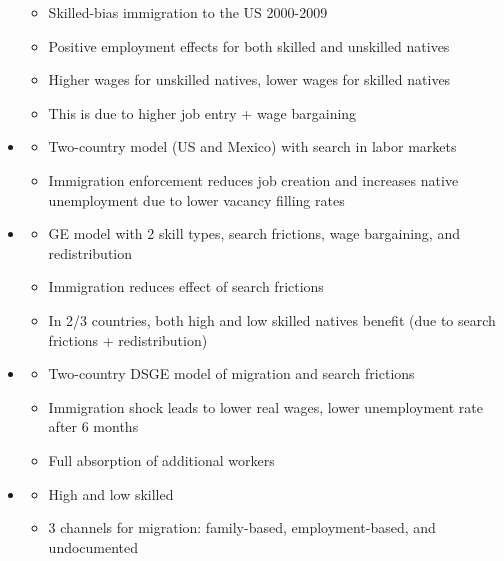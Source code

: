 \documentclass[12pt]{article}
\begin{document}
\begin{itemize}
    \begin{itemize}
        \item Skilled-bias immigration to the US 2000-2009
        \item Positive employment effects for both skilled and unskilled natives
        \item Higher wages for unskilled natives, lower wages for skilled natives
        \item This is due to higher job entry + wage bargaining
    \end{itemize}
    \item \textcite{chassamboulli_peri_RED_2015_illegal_immigration_labor_markets}
    \begin{itemize}
        \item Two-country model (US and Mexico) with search in labor markets
        \item Immigration enforcement reduces job creation and increases native unemployment due to lower vacancy filling rates
    \end{itemize}
    \item \textcite{battisti_felbermayr_peri_poutvaara_JEEA_2017_immigration_search_redistribution}
    \begin{itemize}
        \item GE model with 2 skill types, search frictions, wage bargaining, and redistribution
        \item Immigration reduces effect of search frictions
        \item In 2/3 countries, both high and low skilled natives benefit (due to search frictions + redistribution)
    \end{itemize}
    \item \textcite{hart_clemens_WP_2019_eu_business_cycle_migration_search}
    \begin{itemize}
        \item Two-country DSGE model of migration and search frictions
        \item Immigration shock leads to lower real wages, lower unemployment rate after 6 months
        \item Full absorption of additional workers
    \end{itemize}
    \item \textcite{chassamboulli_peri_JEDC_2020_immigration_policies_US_simulation}
    \begin{itemize}
        \item High and low skilled
        \item 3 channels for migration: family-based, employment-based, and undocumented

\end{itemize}
\end{itemize}
\end{document}

